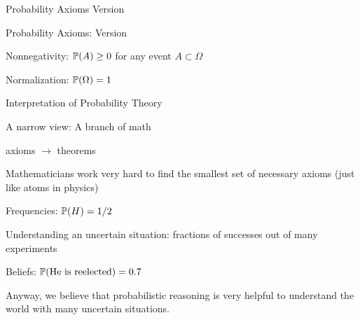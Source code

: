 \documentclass[fleqn,aspectratio=169]{beamer}
\begin{document}
\begin{frame}{Probability Axioms Version  }

\begin{block}{Probability Axioms: Version  }
\plitemsep 0.1in
\bce[{A}1.] 
\item Nonnegativity: $\mathbb{P}( A ) \geq 0$ for any event $A \subset \Omega$
\item Normalization: $\mathbb{P}( \Omega ) = 1$


\ece
\end{block}


\end{frame}

\begin{frame}{Interpretation of Probability Theory}


\plitemsep 0.1in
\bci
\item<1-> A narrow view: A branch of math

\bci
\item axioms $\rightarrow$ theorems
\item Mathematicians work very hard to find the smallest set of necessary axioms (just like atoms in physics)
\eci



\item<2-> Frequencies: $\mathbb{P}( H ) = 1/2$
\bci
\item Understanding an uncertain situation: fractions of successes out of many experiments

\eci


\item<3-> Beliefs: $\mathbb{P}( \text{He is reelected} ) = 0.7$

\eci

\medskip
Anyway, we believe that probabilistic reasoning is very helpful to understand the world with many uncertain situations.
\end{frame}
\end{document}
